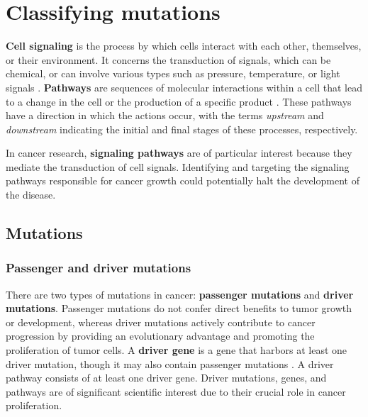 \chapter{Classifying mutations} \label{chap:classifying_mutations}

\textbf{Cell signaling} is the process by which cells interact with each other, themselves, or their environment. It concerns the transduction of signals, which can be chemical, or can involve various types such as pressure, temperature, or light signals \cite{cell_signaling}. \textbf{Pathways} are sequences of molecular interactions within a cell that lead to a change in the cell or the production of a specific product \cite{pathway}. These pathways have a direction in which the actions occur, with the terms \textit{upstream} and \textit{downstream} indicating the initial and final stages of these processes, respectively.

In cancer research, \textbf{signaling pathways} are of particular interest because they mediate the transduction of cell signals. Identifying and targeting the signaling pathways responsible for cancer growth could potentially halt the development of the disease. 

\section{Mutations}

\subsection{Passenger and driver mutations}

There are two types of mutations in cancer: \textbf{passenger mutations} and \textbf{driver mutations}. Passenger mutations do not confer direct benefits to tumor growth or development, whereas driver mutations actively contribute to cancer progression by providing an evolutionary advantage and promoting the proliferation of tumor cells. A \textbf{driver gene} is a gene that harbors at least one driver mutation, though it may also contain passenger mutations . A driver pathway consists of at least one driver gene. Driver mutations, genes, and pathways are of significant scientific interest due to their crucial role in cancer proliferation. 

